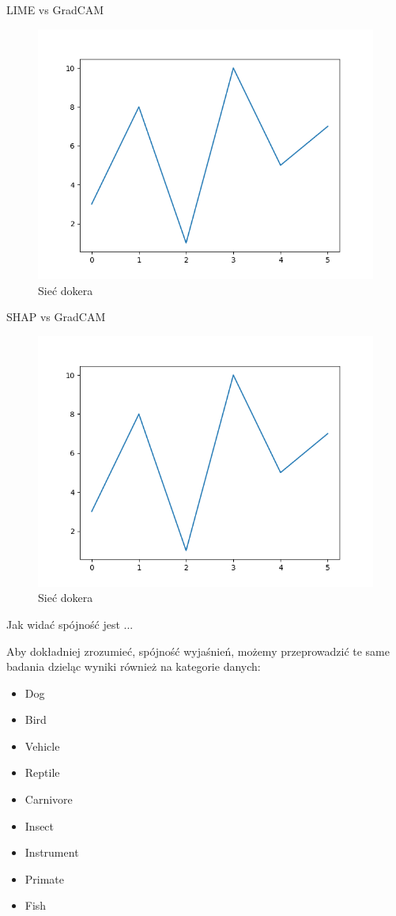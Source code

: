 LIME vs GradCAM
\begin{figure}
  \centering\includegraphics[width=.6\textwidth]{images/example}
\caption{Sieć dokera \cite{docker_compose_reference}}  \label{rys:network}
\end{figure}

SHAP vs GradCAM
\begin{figure}
  \centering\includegraphics[width=.6\textwidth]{images/example}
\caption{Sieć dokera \cite{docker_compose_reference}}  \label{rys:network}
\end{figure}

Jak widać spójność jest ...

Aby dokładniej zrozumieć, spójność wyjaśnień, możemy przeprowadzić te same badania dzieląc wyniki również na kategorie danych:
\begin{itemize}
  \item Dog
  \item Bird
  \item Vehicle
  \item Reptile
  \item Carnivore
  \item Insect
  \item Instrument
  \item Primate
  \item Fish
\end{itemize}

